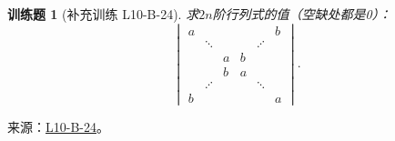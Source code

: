 \documentclass[12pt,fontset=fandol]{ctexart}
\newtheorem{exercise}{训练题}[section]
\begin{document}
\begin{exercise}[补充训练 L10-B-24]\label{prob:L10-B-24}
求$2n$阶行列式的值（空缺处都是0）：
        \[\begin{vmatrix}
                a &         &   &   &         & b \\
                  & \ddots  &   &   & \iddots &   \\
                  &         & a & b &         &   \\
                  &         & b & a &         &   \\
                  & \iddots &   &   & \ddots  &   \\
                b &         &   &   &         & a
            \end{vmatrix}.\]
\end{exercise}
\noindent 来源：\href{https://github.com/yhwu-is/Linear-Algebra-Left-Undone/blob/new/%E8%AE%B2%E4%B9%89/%E4%B8%93%E9%A2%98/10%20%E8%A1%8C%E5%88%97%E5%BC%8F.tex}{L10-B-24}。
\end{document}
